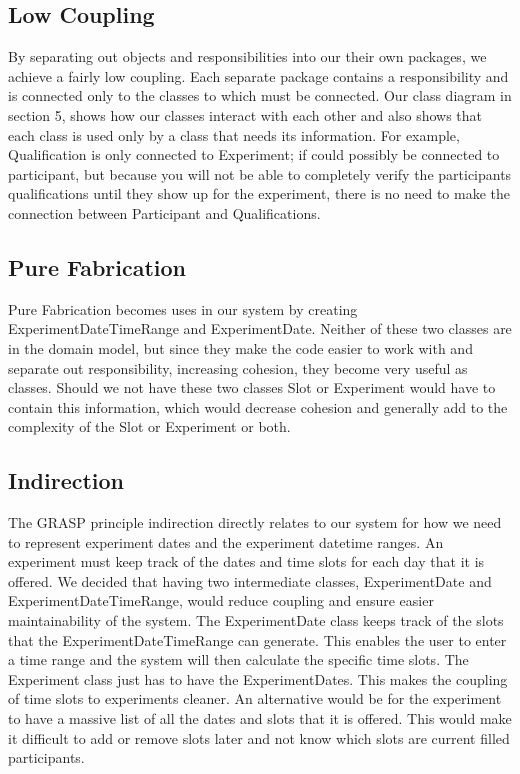 \subsection{Low Coupling}
By separating out objects and responsibilities into our their own packages, we achieve a fairly low coupling.  Each separate package contains a responsibility and is connected only to the classes to which must be connected.  Our class diagram in section 5, shows how our classes interact with each other and also shows that each class is used only by a class that needs its information.  For example, Qualification is only connected to Experiment; if could possibly be connected to participant, but because you will not be able to completely verify the participants qualifications until they show up for the experiment, there is no need to make the connection between Participant and Qualifications.

\subsection{Pure Fabrication}
Pure Fabrication becomes uses in our system by creating ExperimentDateTimeRange and ExperimentDate.  Neither of these two classes are in the domain model, but since they make the code easier to work with and separate out responsibility, increasing cohesion, they become very useful as classes.  Should we not have these two classes Slot or Experiment would have to contain this information, which would decrease cohesion and generally add to the complexity of the Slot or Experiment or both.

\subsection{Indirection}
The GRASP principle indirection directly relates to our system for how we need to represent experiment dates and the experiment datetime ranges. An experiment must keep track of the dates and time slots for each day that it is offered. We decided that having two intermediate classes, ExperimentDate and ExperimentDateTimeRange, would reduce coupling and ensure easier maintainability of the system. The ExperimentDate class keeps track of the slots that the ExperimentDateTimeRange can generate. This enables the user to enter a time range and the system will then calculate the specific time slots. The Experiment class just has to have the ExperimentDates. This makes the coupling of time slots to experiments cleaner. An alternative would be for the experiment to have a massive list of all the dates and slots that it is offered. This would make it difficult to add or remove slots later and not know which slots are current filled participants.

